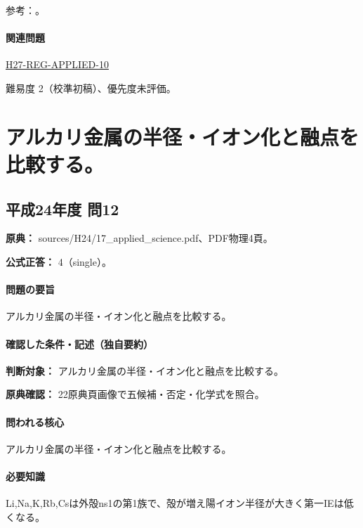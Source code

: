 \par 参考：\cite{inorganic_noble_ref}。

\paragraph{関連問題} \hyperref[q:h27-reg-applied-10]{H27-REG-APPLIED-10}

\par 難易度 2（校準初稿）、優先度未評価。

\section{アルカリ金属の半径・イオン化と融点を比較する。}

\subsection{平成24年度 問12}
\label{q:h24-reg-applied-12}

\noindent\textbf{原典：} sources/H24/17\_applied\_science.pdf、PDF物理4頁。

\textbf{公式正答：} 4（single）。

\paragraph{問題の要旨} アルカリ金属の半径・イオン化と融点を比較する。

\paragraph{確認した条件・記述（独自要約）}\mbox{}\par

\noindent\textbf{判断対象：} アルカリ金属の半径・イオン化と融点を比較する。\par

\noindent\textbf{原典確認：} 22原典頁画像で五候補・否定・化学式を照合。\par

\paragraph{問われる核心} アルカリ金属の半径・イオン化と融点を比較する。

\paragraph{必要知識} Li,Na,K,Rb,Csは外殻ns1の第1族で、殻が増え陽イオン半径が大きく第一IEは低くなる。

